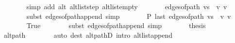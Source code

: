 \begin{isabellebody}
\ \ \ \ \ \ \isamarkupfalse%
\ {\isacharparenleft}{\kern0pt}simp\ add{\isacharcolon}{\kern0pt}\ alt\ alt{\isacharunderscore}{\kern0pt}list{\isacharunderscore}{\kern0pt}step\ alt{\isacharunderscore}{\kern0pt}list{\isacharunderscore}{\kern0pt}empty{\isacharparenright}{\kern0pt}\isanewline
\ \ \ \ \isamarkupfalse%
\ \isamarkupfalse%
\ {\isachardoublequoteopen}edges{\isacharunderscore}{\kern0pt}of{\isacharunderscore}{\kern0pt}path\ {\isacharparenleft}{\kern0pt}vs\ {\isacharat}{\kern0pt}\ {\isacharbrackleft}{\kern0pt}v{\isacharprime}{\kern0pt}{\isacharprime}{\kern0pt}{\isacharcomma}{\kern0pt}\ v{\isacharprime}{\kern0pt}{\isacharbrackright}{\kern0pt}{\isacharparenright}{\kern0pt}\ {\isasymnoteq}\ {\isacharbrackleft}{\kern0pt}{\isacharbrackright}{\kern0pt}{\isachardoublequoteclose}\isanewline
\ \ \ \ \ \ \isamarkupfalse%
\ {\isacharparenleft}{\kern0pt}subst\ edges{\isacharunderscore}{\kern0pt}of{\isacharunderscore}{\kern0pt}path{\isacharunderscore}{\kern0pt}append{\isacharunderscore}{\kern0pt}{}{\isacharparenright}{\kern0pt}\ simp{\isacharplus}{\kern0pt}\isanewline
\ \ \ \ \isamarkupfalse%
\ \isamarkupfalse%
\ {\isachardoublequoteopen}P\ {\isacharparenleft}{\kern0pt}last\ {\isacharparenleft}{\kern0pt}edges{\isacharunderscore}{\kern0pt}of{\isacharunderscore}{\kern0pt}path\ {\isacharparenleft}{\kern0pt}vs\ {\isacharat}{\kern0pt}\ {\isacharbrackleft}{\kern0pt}v{\isacharprime}{\kern0pt}{\isacharprime}{\kern0pt}{\isacharcomma}{\kern0pt}\ v{\isacharprime}{\kern0pt}{\isacharbrackright}{\kern0pt}{\isacharparenright}{\kern0pt}{\isacharparenright}{\kern0pt}{\isacharparenright}{\kern0pt}{\isachardoublequoteclose}\isanewline
\ \ \ \ \ \ \isamarkupfalse%
\ True\isanewline
\ \ \ \ \ \ \isamarkupfalse%
\ {\isacharparenleft}{\kern0pt}subst\ edges{\isacharunderscore}{\kern0pt}of{\isacharunderscore}{\kern0pt}path{\isacharunderscore}{\kern0pt}append{\isacharunderscore}{\kern0pt}{}{\isacharparenright}{\kern0pt}\ simp{\isacharplus}{\kern0pt}\isanewline
\ \ \ \ \isamarkupfalse%
\ \isamarkupfalse%
\ {\isacharquery}{\kern0pt}thesis\isanewline
\ \ \ \ \ \ \isamarkupfalse%
\ alt{\isacharunderscore}{\kern0pt}path\isanewline
\ \ \ \ \ \ \isamarkupfalse%
\ {\isacharparenleft}{\kern0pt}auto\ dest{\isacharcolon}{\kern0pt}\ alt{\isacharunderscore}{\kern0pt}pathD{\isacharparenleft}{\kern0pt}{}{\isacharparenright}{\kern0pt}\ intro{\isacharcolon}{\kern0pt}\ alt{\isacharunderscore}{\kern0pt}list{\isacharunderscore}{\kern0pt}append{\isacharunderscore}{\kern0pt}{}{\isacharprime}{\kern0pt}{\isacharparenright}{\kern0pt}\isanewline

\end{isabellebody}
